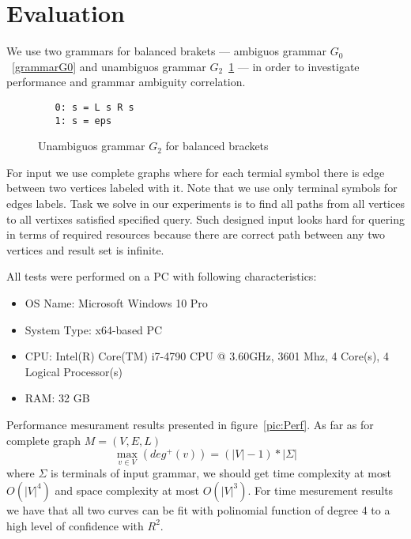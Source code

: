\section{Evaluation}

We use two grammars for balanced brakets --- ambiguos grammar $G_0$~\ref{grammarG0} and unambiguos grammar $G_2$~\ref{grammarG2} --- in order to investigate performance and grammar ambiguity correlation.

\begin{figure}[ht]
   \begin{center}
\begin{verbatim}
   0: s = L s R s 
   1: s = eps
\end{verbatim}
   \caption{Unambiguos grammar $G_2$ for balanced brackets}
   \label{grammarG2}        
   \end{center}
\end{figure}

For input we use complete graphs where for each termial symbol there is edge between two vertices labeled with it.
Note that we use only terminal symbols for edges labels.  
Task we solve in our experiments is to find all paths from all vertices to all vertixes satisfied specified query.
Such designed input looks hard for quering in terms of required resources because there are correct path between any two vertices and result set is infinite.

All tests were performed on a PC with following characteristics:
\begin{itemize}
\item OS Name: Microsoft Windows 10 Pro
\item System Type: x64-based PC
\item CPU: Intel(R) Core(TM) i7-4790 CPU @ 3.60GHz, 3601 Mhz, 4 Core(s), 4 Logical Processor(s)
\item RAM: 32 GB
\end{itemize}

Performance mesurament results presented in figure~\ref{pic:Perf}. 
As far as for complete graph $M=(V,E,L)$ $$\max\limits_{v \in V}\left(deg^+\left(v\right)\right) = (|V| - 1)*|\Sigma|$$ where $\Sigma$ is terminals of input grammar, we should get time complexity at most $O(|V|^4)$ and space complexity at most $O(|V|^3)$.
For time mesurement results we have that all two curves can be fit with polinomial function of degree 4 to a high level of confidence with $R^2$. 


